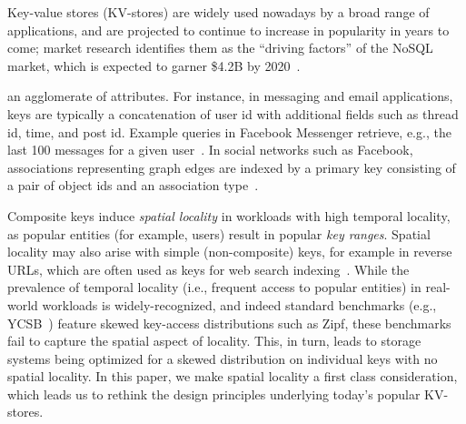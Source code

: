 


Key-value stores (KV-stores) are widely used nowadays by a broad range of applications, and are projected
to continue to increase in popularity in years to come; market research  identifies them as the 
``driving factors'' of the NoSQL market, which is expected to garner \$4.2B by 2020~\cite{alliedmarketresearch}.

{} an agglomerate of attributes. {}  
For instance,  in messaging and email applications, keys are typically a concatenation of user id with additional fields 
such as thread id, time, and post id. Example queries in Facebook Messenger retrieve, e.g., the last 100 messages for a 
given user~\cite{Borthakur:2011:AHG:1989323.1989438}. %
In social networks such as Facebook, associations representing graph edges are indexed by a primary key consisting of a 
pair of object ids and an association type~\cite{Armstrong:2013:LDB:2463676.2465296}.
{}

Composite keys induce \emph{spatial locality} in workloads with high {temporal locality}, as 
popular entities (for example, users) result in popular \emph{key ranges}. 
Spatial locality may also arise with simple (non-composite) keys, for example in 
 reverse  URLs, which  are often used as keys for web search indexing~\cite{Cho:1998:ECT:297805.297835}. 
While the prevalence of temporal locality (i.e., frequent access to popular entities) in real-world workloads is widely-recognized, 
and indeed standard benchmarks (e.g., YCSB~\cite{YCSB})  feature skewed key-access distributions such as Zipf, 
these benchmarks fail to capture the spatial aspect of locality.
This, in turn, leads to storage systems being optimized for a skewed distribution on individual keys with no spatial locality.
In this paper, we make spatial locality a first class  consideration, which 
leads us to rethink the design principles underlying today's popular KV-stores.

